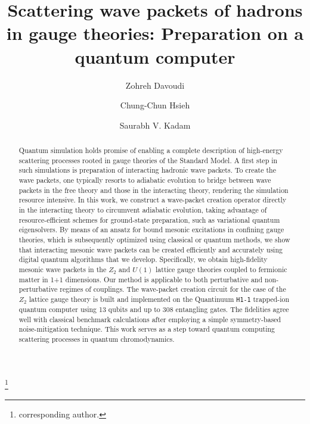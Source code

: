 \documentclass[a4paper,onecolumn,11pt,accepted=2024-10-11]{quantumarticle}
\begin{document}
\title{Scattering wave packets of hadrons in gauge theories: Preparation on a quantum computer
}

\author{Zohreh Davoudi}

\author{Chung-Chun Hsieh}
\thanks{corresponding author.}

\author{Saurabh V. Kadam}

\begin{abstract}
Quantum simulation holds promise of enabling a complete description of high-energy scattering processes rooted in gauge theories of the Standard Model. A first step in such simulations is preparation of interacting hadronic wave packets. To create the wave packets, one typically resorts to adiabatic evolution to bridge between wave packets in the free theory and those in the interacting theory, rendering the simulation resource intensive. In this work, we construct a wave-packet creation operator directly in the interacting theory to circumvent adiabatic evolution, taking advantage of resource-efficient schemes for ground-state preparation, such as variational quantum eigensolvers. By means of an ansatz for bound mesonic excitations in confining gauge theories, which is subsequently optimized using classical or quantum methods, we show that interacting mesonic wave packets can be created efficiently and accurately using digital quantum algorithms that we develop. Specifically, we obtain high-fidelity mesonic wave packets in the $Z_2$ and $U(1)$ lattice gauge theories coupled to fermionic matter in 1+1 dimensions. Our method is applicable to both perturbative and non-perturbative regimes of couplings. The wave-packet creation circuit for the case of the $Z_2$ lattice gauge theory is built and implemented on the Quantinuum \texttt{H1-1} trapped-ion quantum computer using 13 qubits and up to 308 entangling gates. The fidelities agree well with classical benchmark calculations after employing a simple symmetry-based noise-mitigation technique. This work serves as a step toward quantum computing scattering processes in quantum chromodynamics. 
\end{abstract}
\end{document}
